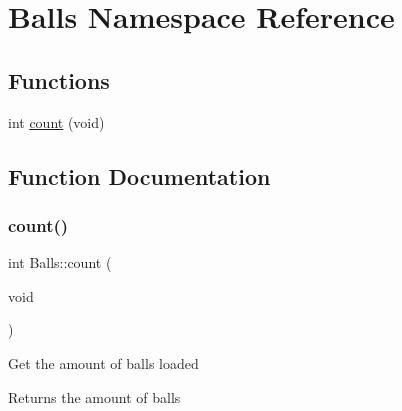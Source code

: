 \hypertarget{namespace_balls}{}\section{Balls Namespace Reference}
\label{namespace_balls}
\subsection*{Functions}
\begin{DoxyCompactItemize}
\item 
int \mbox{\hyperlink{namespace_balls_a4e9512d87616c83a0fd48bff97f122d1}{count}} (void)
\end{DoxyCompactItemize}


\subsection{Function Documentation}
\mbox{\label{namespace_balls_a4e9512d87616c83a0fd48bff97f122d1}} 
\subsubsection{\texorpdfstring{count()}{count()}}
{\footnotesize\ttfamily int Balls\+::count (\begin{DoxyParamCaption}\item[{void}]{ }\end{DoxyParamCaption})}

Get the amount of balls loaded

\begin{DoxyReturn}{Returns}
the amount of balls 
\end{DoxyReturn}
